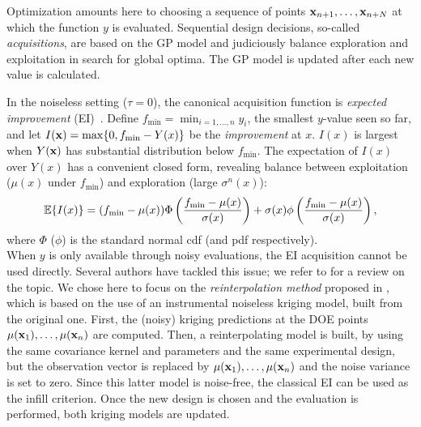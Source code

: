 Optimization amounts here to choosing a sequence of points $\mathbf{x}_{n+1}, \ldots, \mathbf{x}_{n+N}$ at which the function $y$ is evaluated.
Sequential design decisions, so-called {\em acquisitions}, are based on the GP model and judiciously balance exploration and exploitation 
in search for global optima. The GP model is updated after each new value is calculated.

In the noiseless setting ($\tau=0$), the canonical acquisition function is {\em expected improvement} (EI)~\cite{jones1998efficient}. 
Define $f_{\min} = \min_{i=1,\ldots,n} y_i$, the smallest $y$-value seen so
far, and let $I(\mathbf{x}) = \max\{ 0, f_{\min} - Y(x) \}$
be the {\em improvement} at $x$.  $I(x)$ is largest when $Y(\mathbf{x})$ has
substantial distribution below $f_{\min}$. 
The expectation of $I(x)$ over $Y(x)$ has a convenient closed form,
revealing balance between exploitation ($\mu(x)$ under $f_{\min}$) and
exploration (large $\sigma^{n}(x)$):
\begin{equation}
\mathbb{E} \{I(x)\} = (f_{\min} - \mu(x)) \Phi\left(
\frac{f_{\min} - \mu(x)}{\sigma(x)}\right)
+ \sigma(x) \phi\left(
\frac{f_{\min} - \mu(x)}{\sigma(x)}\right),
\label{eq:ei}
\end{equation}
where $\Phi$ ($\phi$) is the standard normal cdf (and pdf respectively). \\

When $y$ is only available through noisy evaluations, the EI acquisition cannot be used directly.
Several authors have tackled this issue; we refer to \cite{picheny2013benchmark} for a review on the topic.
We chose here to focus on the \textit{reinterpolation method} proposed in \cite{forrester2006design}, which is based on the use of an instrumental noiseless kriging model, 
built from the original one. First, the (noisy) kriging predictions at the DOE points $\mu(\mathbf{x}_1), \ldots, \mu(\mathbf{x}_n)$ are computed. 
Then, a reinterpolating model is built, by using the same covariance kernel and parameters and the same experimental design, but
the observation vector is replaced by $\mu(\mathbf{x}_1), \ldots, \mu(\mathbf{x}_n)$ and the noise variance is set to zero. Since this latter model is
noise-free, the classical EI can be used as the infill criterion. Once the new design is chosen and the evaluation is performed,
both kriging models are updated. 
% 

